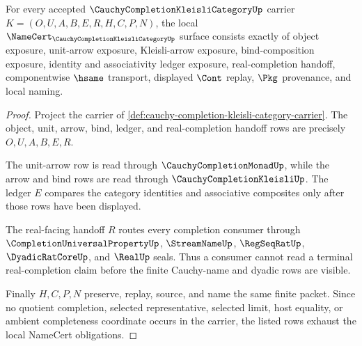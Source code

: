 \begin{theorem}
\label{thm:cauchy-completion-kleisli-category-namecert-obligations}
For every accepted $\CauchyCompletionKleisliCategoryUp$ carrier $K=(O,U,A,B,E,R,H,C,P,N)$, the local $\NameCert_{\CauchyCompletionKleisliCategoryUp}$ surface consists exactly of object exposure, unit-arrow exposure, Kleisli-arrow exposure, bind-composition exposure, identity and associativity ledger exposure, real-completion handoff, componentwise $\hsame$ transport, displayed $\Cont$ replay, $\Pkg$ provenance, and local naming.
\end{theorem}
\begin{proof}
Project the carrier of \autoref{def:cauchy-completion-kleisli-category-carrier}. The object, unit, arrow, bind, ledger, and real-completion handoff rows are precisely $O,U,A,B,E,R$.

The unit-arrow row is read through $\CauchyCompletionMonadUp$, while the arrow and bind rows are read through $\CauchyCompletionKleisliUp$. The ledger $E$ compares the category identities and associative composites only after those rows have been displayed.

The real-facing handoff $R$ routes every completion consumer through $\CompletionUniversalPropertyUp$, $\StreamNameUp$, $\RegSeqRatUp$, $\DyadicRatCoreUp$, and $\RealUp$ seals. Thus a consumer cannot read a terminal real-completion claim before the finite Cauchy-name and dyadic rows are visible.

Finally $H,C,P,N$ preserve, replay, source, and name the same finite packet. Since no quotient completion, selected representative, selected limit, host equality, or ambient completeness coordinate occurs in the carrier, the listed rows exhaust the local NameCert obligations.
\end{proof}

